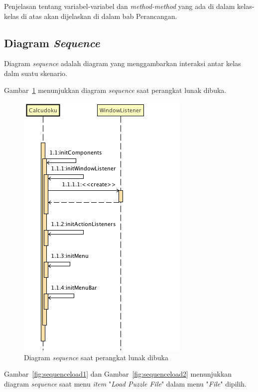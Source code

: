 Penjelasan tentang variabel-variabel dan \textit{method-method} yang ada di dalam kelas-kelas di atas akan dijelaskan di dalam bab Perancangan.

\subsection{Diagram \textit{Sequence}}
\label{sec:diagramsequence}

Diagram \textit{sequence} adalah diagram yang menggambarkan interaksi antar kelas dalm suatu skenario.

Gambar~\ref{fig:sequenceconstructor} menunjukkan diagram \textit{sequence} saat perangkat lunak dibuka.

\begin{figure}
\centering
\captionsetup{justification=centering}
\includegraphics[scale=0.5]{Gambar/Analisis/SequenceDiagramConstructor.png}
\caption[Diagram \textit{sequence} saat perangkat lunak dibuka]{Diagram \textit{sequence} saat perangkat lunak dibuka}
\label{fig:sequenceconstructor}
\end{figure}

Gambar~\ref{fig:sequenceload1} dan Gambar~\ref{fig:sequenceload2} menunjukkan diagram \textit{sequence} saat menu \textit{item} "\textit{Load Puzzle File}" dalam menu "\textit{File}" dipilih.

